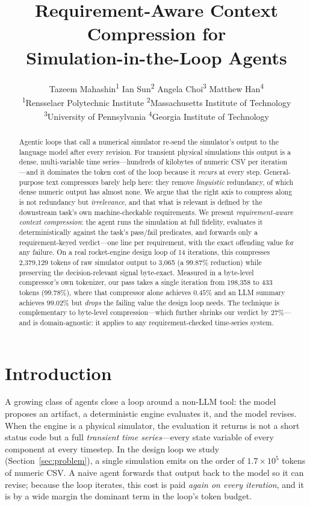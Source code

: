\documentclass[10pt,twocolumn]{article}
\title{\bfseries Requirement-Aware Context Compression for\\
Simulation-in-the-Loop Agents}
\author{%
  Tazeem Mahashin\textsuperscript{1} \quad
  Ian Sun\textsuperscript{2} \quad
  Angela Choi\textsuperscript{3} \quad
  Matthew Han\textsuperscript{4}\\[3pt]
  \normalsize\textsuperscript{1}Rensselaer Polytechnic Institute \quad
  \textsuperscript{2}Massachusetts Institute of Technology\\
  \normalsize\textsuperscript{3}University of Pennsylvania \quad
  \textsuperscript{4}Georgia Institute of Technology%
}
\date{}
\begin{document}
\maketitle

\begin{abstract}
\noindent
Agentic loops that call a numerical simulator re-send the simulator's output to
the language model after every revision. For transient physical simulations this
output is a dense, multi-variable time series---hundreds of kilobytes of numeric
CSV per iteration---and it dominates the token cost of the loop because it
\emph{recurs} at every step. General-purpose text compressors barely help here:
they remove \emph{linguistic} redundancy, of which dense numeric output has
almost none. We argue that the right axis to compress along is not redundancy but
\emph{irrelevance}, and that what is relevant is defined by the downstream task's
own machine-checkable requirements. We present \emph{requirement-aware context
compression}: the agent runs the simulation at full fidelity, evaluates it
deterministically against the task's pass/fail predicates, and forwards only a
requirement-keyed verdict---one line per requirement, with the exact offending
value for any failure. On a real rocket-engine design loop of 14 iterations, this
compresses \mbox{2{,}379{,}129} tokens of raw simulator output to \mbox{3{,}065}
(a $99.87\%$ reduction) while preserving the decision-relevant signal byte-exact.
Measured in a byte-level compressor's own tokenizer, our pass takes a single
iteration from \mbox{198{,}358} to $433$ tokens ($99.78\%$), where that
compressor alone achieves $0.45\%$ and an LLM summary achieves $99.02\%$ but
\emph{drops} the failing value the design loop needs. The technique is
complementary to byte-level compression---which further shrinks our verdict by
$27\%$---and is domain-agnostic: it applies to any requirement-checked
time-series system.
\end{abstract}

\section{Introduction}
\label{sec:intro}

A growing class of agents close a loop around a non-LLM tool: the model proposes
an artifact, a deterministic engine evaluates it, and the model revises. When the
engine is a physical simulator, the evaluation it returns is not a short status
code but a full \emph{transient time series}---every state variable of every
component at every timestep. In the design loop we study (Section~\ref{sec:problem}),
a single simulation emits on the order of $1.7\times10^{5}$ tokens of numeric CSV.
A naive agent forwards that output back to the model so it can revise; because the
loop iterates, this cost is paid \emph{again on every iteration}, and it is by a
wide margin the dominant term in the loop's token budget.
\end{document}
